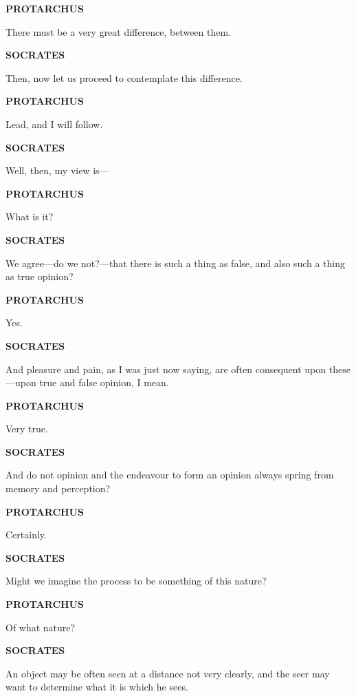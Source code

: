 \documentclass[11pt,letter]{article}
\begin{document}
\par \textbf{PROTARCHUS}
\par   There must be a very great difference, between them.

\par \textbf{SOCRATES}
\par   Then, now let us proceed to contemplate this difference.

\par \textbf{PROTARCHUS}
\par   Lead, and I will follow.

\par \textbf{SOCRATES}
\par   Well, then, my view is—

\par \textbf{PROTARCHUS}
\par   What is it?

\par \textbf{SOCRATES}
\par   We agree—do we not?—that there is such a thing as false, and also such a thing as true opinion?

\par \textbf{PROTARCHUS}
\par   Yes.

\par \textbf{SOCRATES}
\par   And pleasure and pain, as I was just now saying, are often consequent upon these—upon true and false opinion, I mean.

\par \textbf{PROTARCHUS}
\par   Very true.

\par \textbf{SOCRATES}
\par   And do not opinion and the endeavour to form an opinion always spring from memory and perception?

\par \textbf{PROTARCHUS}
\par   Certainly.

\par \textbf{SOCRATES}
\par   Might we imagine the process to be something of this nature?

\par \textbf{PROTARCHUS}
\par   Of what nature?

\par \textbf{SOCRATES}
\par   An object may be often seen at a distance not very clearly, and the seer may want to determine what it is which he sees.
\end{document}
